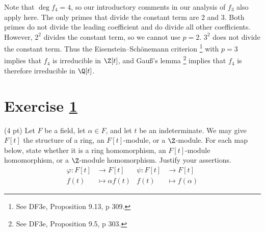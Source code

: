 {Note that $\deg f_{4} = 4$, so our introductory comments in our analysis of $f_{3}$ also apply here. The only primes that divide the constant term are $2$ and $3$. Both primes do not divide the leading coefficient and do divide all other coefficients. However, $2^{2}$ divides the constant term, so we cannot use $p = 2$. $3^{2}$ does not divide the constant term. Thus the Eisenstein--Sch\"{o}nemann criterion%
\footnote{See DF3e, Proposition 9.13, p 309.} %
with $p = 3$ implies that $f_{4}$ is irreducible in $\Z[t]$, and Gau\ss{}'s lemma%
\footnote{See DF3e, Proposition 9.5, p 303.} %
implies that $f_{4}$ is therefore irreducible in $\Q[t]$.}%



\section{Exercise \ref{sec : e01q4}}
\label{sec : e01q4}

(4 pt) Let $F$ be a field, let $\alpha \in F$, and let $t$ be an indeterminate. We may give $F[t]$ the structure of a ring, an $F[t]$-module, or a $\Z$-module. For each map below, state whether it is a ring homomorphism, an $F[t]$-module homomorphism, or a $\Z$-module homomorphism. Justify your assertions. 
\begin{align*}
\varphi
:
F[t]
&\rightarrow
F[t]
&
\psi
:
F[t]
&\rightarrow
F[t]
\\
f(t)
&\mapsto
\alpha f(t)
&
f(t)
&\mapsto
f(\alpha)
\end{align*}

